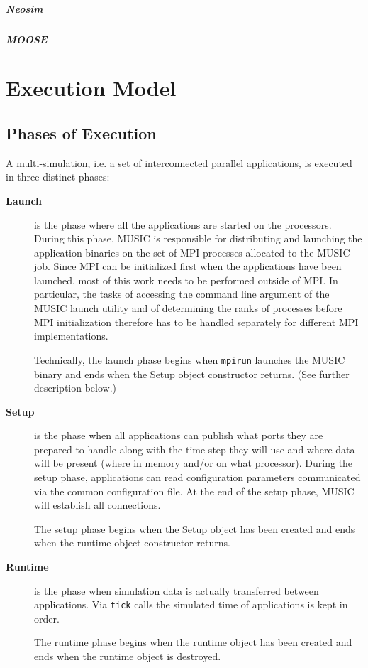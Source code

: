 \documentclass[a4paper,twoside]{report}
\begin{document}
\begin{metatext}
\paragraph{Neosim}

\paragraph{MOOSE}
\end{metatext}

\chapter{Execution Model}

\section{Phases of Execution}

A multi-simulation, i.e. a set of interconnected parallel
applications, is executed in three distinct phases:
\begin{description}
\item[\textbf{Launch}] is the phase where all the
  applications are started on the processors.  During this phase,
  MUSIC is responsible for distributing and launching the application
  binaries on the set of MPI processes allocated to the MUSIC job.
  Since MPI can be initialized first when the applications have been
  launched, most of this work needs to be performed outside of MPI.
  In particular, the tasks of accessing the command line argument of
  the MUSIC launch utility and of determining the ranks of processes
  before MPI initialization therefore has to be handled separately for
  different MPI implementations.

  Technically, the launch phase begins when \texttt{mpirun} launches
  the MUSIC binary and ends when the Setup object constructor
  returns.  (See further description below.)

\item[\textbf{Setup}] is the phase when all
  applications can publish what ports they are prepared to handle
  along with the time step they will use and where data will be
  present (where in memory and/or on what processor).  During the
  setup phase, applications can read configuration parameters
  communicated via the common configuration file.  At the end of the
  setup phase, MUSIC will establish all connections.

  The setup phase begins when the Setup object has been created and
  ends when the runtime object constructor returns.

\item[\textbf{Runtime}] is the phase when
  simulation data is actually transferred between applications.  Via
  \texttt{tick} calls the simulated time of applications is
  kept in order.

  The runtime phase begins when the runtime object has been created
  and ends when the runtime object is destroyed.
\end{description}
\end{document}
